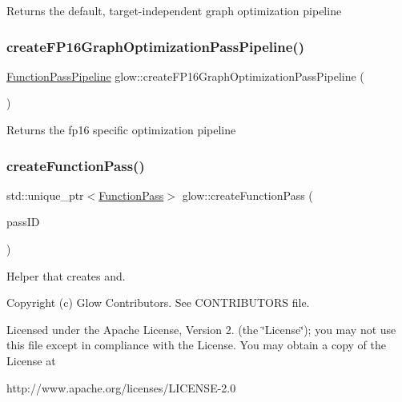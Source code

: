 \begin{DoxyReturn}{Returns}
the default, target-\/independent graph optimization pipeline 
\end{DoxyReturn}
\mbox{\label{namespaceglow_a2cba8b151906d972e63ced04b7e02242}} 
\subsubsection{\texorpdfstring{create\+F\+P16\+Graph\+Optimization\+Pass\+Pipeline()}{createFP16GraphOptimizationPassPipeline()}}
{\footnotesize\ttfamily \hyperlink{classglow_1_1_function_pass_pipeline}{Function\+Pass\+Pipeline} glow\+::create\+F\+P16\+Graph\+Optimization\+Pass\+Pipeline (\begin{DoxyParamCaption}{ }\end{DoxyParamCaption})}

\begin{DoxyReturn}{Returns}
the fp16 specific optimization pipeline 
\end{DoxyReturn}
\mbox{\label{namespaceglow_a77f32741a0e156b7bd043992d6eedc6c}} 
\subsubsection{\texorpdfstring{create\+Function\+Pass()}{createFunctionPass()}}
{\footnotesize\ttfamily std\+::unique\+\_\+ptr$<$\hyperlink{classglow_1_1_function_pass}{Function\+Pass}$>$ glow\+::create\+Function\+Pass (\begin{DoxyParamCaption}\item[{\hyperlink{namespaceglow_a3157945b92abd634c79fa9d4724472eb}{Function\+Pass\+ID}}]{pass\+ID }\end{DoxyParamCaption})}



Helper that creates and. 

Copyright (c) Glow Contributors. See C\+O\+N\+T\+R\+I\+B\+U\+T\+O\+RS file.

Licensed under the Apache License, Version 2. (the \char`\"{}\+License\char`\"{}); you may not use this file except in compliance with the License. You may obtain a copy of the License at \begin{DoxyVerb}http://www.apache.org/licenses/LICENSE-2.0
\end{DoxyVerb}


